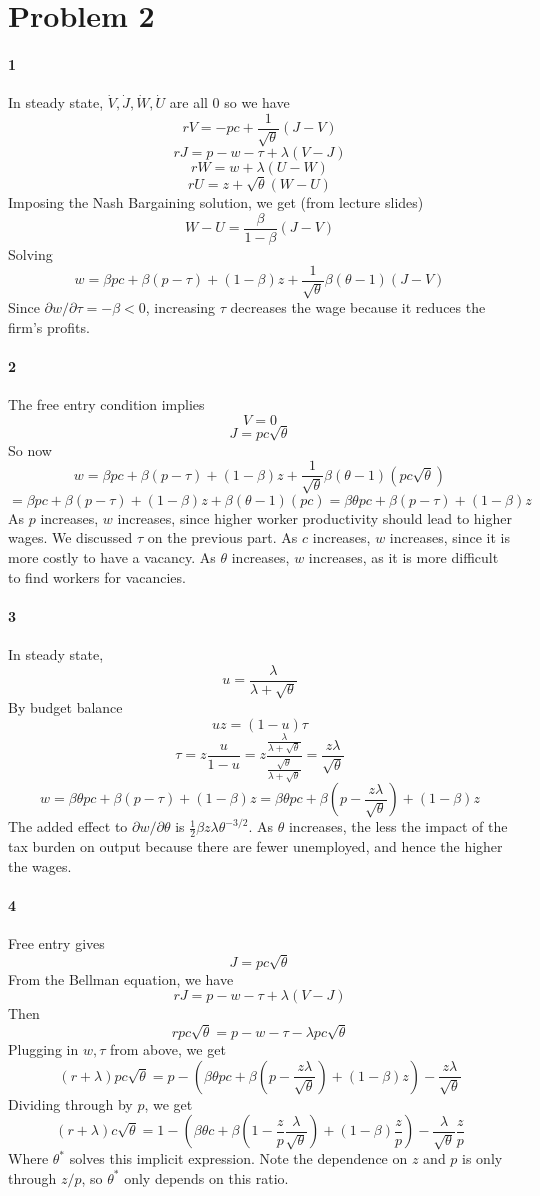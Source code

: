 \documentclass[10pt,letter]{article}
\newcommand{\problem}[1]{\section*{Problem #1}}
\newcommand{\problempart}[1]{\paragraph{#1}}
\begin{document}
\problem{2}
\problempart{1}
In steady state, $\dot{V}, \dot{J}, \dot{W}, \dot{U}$ are all 0 so we have
\[ rV = -pc+\frac{1}{\sqrt{\theta}}(J-V) \]
\[ rJ = p - w - \tau + \lambda(V - J) \]
\[ rW = w + \lambda(U - W)\]
\[ rU = z + \sqrt{\theta}(W-U) \]
Imposing the Nash Bargaining solution, we get (from lecture slides)
\[ W - U = \frac{\beta}{1-\beta}(J-V) \]
Solving
\[ w = \beta p c + \beta (p - \tau) + (1-\beta)z + \frac{1}{\sqrt{\theta}}\beta(\theta - 1)(J - V) \]
Since $\partial w/ \partial \tau = -\beta < 0$, increasing $\tau$ decreases the wage because it reduces the firm's profits.
\problempart{2}
The free entry condition implies
\[ V = 0 \]
\[ J = pc \sqrt{\theta} \]
So now
\[ w = \beta p c + \beta (p - \tau) + (1-\beta)z + \frac{1}{\sqrt{\theta}}\beta(\theta - 1)(pc\sqrt{\theta}) \]
\[ = \beta p c + \beta (p - \tau) + (1-\beta)z + \beta(\theta - 1)(pc) = \beta \theta p c + \beta (p - \tau) + (1-\beta)z \]
As $p$ increases, $w$ increases, since higher worker productivity should lead to higher wages. We discussed $\tau$ on the previous part. As $c$ increases, $w$ increases, since it is more costly to have a vacancy. As $\theta$ increases, $w$ increases, as it is more difficult to find workers for vacancies.
\problempart{3}
In steady state,
\[ u = \frac{\lambda}{\lambda + \sqrt{\theta}} \]
By budget balance
\[ uz = (1-u)\tau \]
\[ \tau = z\frac{u}{1-u} = z \frac{\frac{\lambda}{\lambda + \sqrt{\theta}}}{\frac{\sqrt{\theta}}{\lambda + \sqrt{\theta}}} = \frac{z\lambda}{\sqrt{\theta}}\]
\[ w = \beta \theta p c + \beta (p - \tau) + (1-\beta)z = \beta \theta p c + \beta \left(p - \frac{z\lambda}{\sqrt{\theta}}\right) + (1-\beta)z\]
The added effect to $\partial w/ \partial \theta$ is $\frac{1}{2}\beta z\lambda \theta^{-3/2}$. As $\theta$ increases, the less the impact of the tax burden on output because there are fewer unemployed, and hence the higher the wages.
\problempart{4}
Free entry gives
\[ J = pc \sqrt{\theta} \]
From the Bellman equation, we have
\[ rJ = p - w - \tau + \lambda(V - J) \]
Then
\[ rpc \sqrt{\theta} = p - w - \tau - \lambda pc \sqrt{\theta} \]
Plugging in $w, \tau$ from above, we get
\[ (r + \lambda)pc \sqrt{\theta} = p - \left(\beta \theta p c + \beta \left(p - \frac{z\lambda}{\sqrt{\theta}}\right) + (1-\beta)z\right) - \frac{z\lambda}{\sqrt{\theta}}  \]
Dividing through by $p$, we get
\[ (r + \lambda)c \sqrt{\theta} = 1 - \left(\beta \theta  c + \beta \left( 1 - \frac{z}{p}\frac{\lambda}{\sqrt{\theta}}\right) + (1-\beta)\frac{z}{p}\right) - \frac{\lambda}{\sqrt{\theta}}\frac{z}{p}  \]
Where $\theta^*$ solves this implicit expression. Note the dependence on $z$ and $p$ is only through $z/p$, so $\theta^*$ only depends on this ratio.
\end{document}
